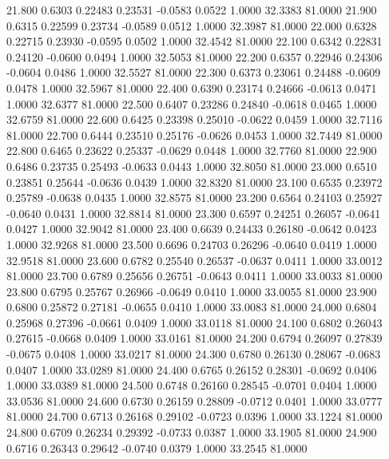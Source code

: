   21.800   0.6303   0.22483   0.23531  -0.0583   0.0522   1.0000  32.3383  81.0000
  21.900   0.6315   0.22599   0.23734  -0.0589   0.0512   1.0000  32.3987  81.0000
  22.000   0.6328   0.22715   0.23930  -0.0595   0.0502   1.0000  32.4542  81.0000
  22.100   0.6342   0.22831   0.24120  -0.0600   0.0494   1.0000  32.5053  81.0000
  22.200   0.6357   0.22946   0.24306  -0.0604   0.0486   1.0000  32.5527  81.0000
  22.300   0.6373   0.23061   0.24488  -0.0609   0.0478   1.0000  32.5967  81.0000
  22.400   0.6390   0.23174   0.24666  -0.0613   0.0471   1.0000  32.6377  81.0000
  22.500   0.6407   0.23286   0.24840  -0.0618   0.0465   1.0000  32.6759  81.0000
  22.600   0.6425   0.23398   0.25010  -0.0622   0.0459   1.0000  32.7116  81.0000
  22.700   0.6444   0.23510   0.25176  -0.0626   0.0453   1.0000  32.7449  81.0000
  22.800   0.6465   0.23622   0.25337  -0.0629   0.0448   1.0000  32.7760  81.0000
  22.900   0.6486   0.23735   0.25493  -0.0633   0.0443   1.0000  32.8050  81.0000
  23.000   0.6510   0.23851   0.25644  -0.0636   0.0439   1.0000  32.8320  81.0000
  23.100   0.6535   0.23972   0.25789  -0.0638   0.0435   1.0000  32.8575  81.0000
  23.200   0.6564   0.24103   0.25927  -0.0640   0.0431   1.0000  32.8814  81.0000
  23.300   0.6597   0.24251   0.26057  -0.0641   0.0427   1.0000  32.9042  81.0000
  23.400   0.6639   0.24433   0.26180  -0.0642   0.0423   1.0000  32.9268  81.0000
  23.500   0.6696   0.24703   0.26296  -0.0640   0.0419   1.0000  32.9518  81.0000
  23.600   0.6782   0.25540   0.26537  -0.0637   0.0411   1.0000  33.0012  81.0000
  23.700   0.6789   0.25656   0.26751  -0.0643   0.0411   1.0000  33.0033  81.0000
  23.800   0.6795   0.25767   0.26966  -0.0649   0.0410   1.0000  33.0055  81.0000
  23.900   0.6800   0.25872   0.27181  -0.0655   0.0410   1.0000  33.0083  81.0000
  24.000   0.6804   0.25968   0.27396  -0.0661   0.0409   1.0000  33.0118  81.0000
  24.100   0.6802   0.26043   0.27615  -0.0668   0.0409   1.0000  33.0161  81.0000
  24.200   0.6794   0.26097   0.27839  -0.0675   0.0408   1.0000  33.0217  81.0000
  24.300   0.6780   0.26130   0.28067  -0.0683   0.0407   1.0000  33.0289  81.0000
  24.400   0.6765   0.26152   0.28301  -0.0692   0.0406   1.0000  33.0389  81.0000
  24.500   0.6748   0.26160   0.28545  -0.0701   0.0404   1.0000  33.0536  81.0000
  24.600   0.6730   0.26159   0.28809  -0.0712   0.0401   1.0000  33.0777  81.0000
  24.700   0.6713   0.26168   0.29102  -0.0723   0.0396   1.0000  33.1224  81.0000
  24.800   0.6709   0.26234   0.29392  -0.0733   0.0387   1.0000  33.1905  81.0000
  24.900   0.6716   0.26343   0.29642  -0.0740   0.0379   1.0000  33.2545  81.0000
